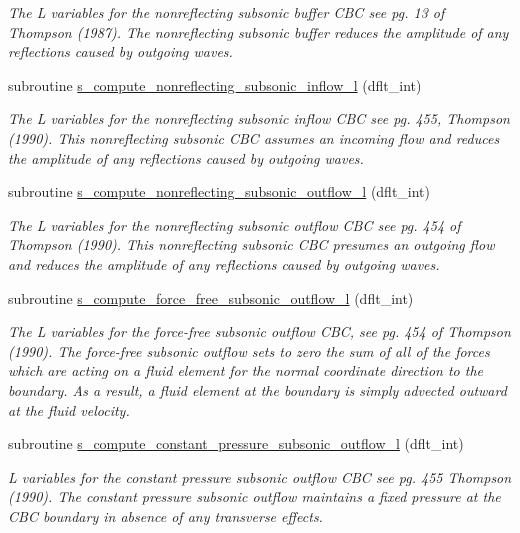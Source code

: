\begin{DoxyCompactItemize}
\begin{DoxyCompactList}\small\item\em The L variables for the nonreflecting subsonic buffer C\+BC see pg. 13 of Thompson (1987). The nonreflecting subsonic buffer reduces the amplitude of any reflections caused by outgoing waves. \end{DoxyCompactList}\item 
subroutine \hyperlink{namespacem__cbc_aaaa6698b1ae1671a9124bb22617b4b8c}{s\+\_\+compute\+\_\+nonreflecting\+\_\+subsonic\+\_\+inflow\+\_\+l} (dflt\+\_\+int)
\begin{DoxyCompactList}\small\item\em The L variables for the nonreflecting subsonic inflow C\+BC see pg. 455, Thompson (1990). This nonreflecting subsonic C\+BC assumes an incoming flow and reduces the amplitude of any reflections caused by outgoing waves. \end{DoxyCompactList}\item 
subroutine \hyperlink{namespacem__cbc_af0664437857269683e572ec7b5e3b4b7}{s\+\_\+compute\+\_\+nonreflecting\+\_\+subsonic\+\_\+outflow\+\_\+l} (dflt\+\_\+int)
\begin{DoxyCompactList}\small\item\em The L variables for the nonreflecting subsonic outflow C\+BC see pg. 454 of Thompson (1990). This nonreflecting subsonic C\+BC presumes an outgoing flow and reduces the amplitude of any reflections caused by outgoing waves. \end{DoxyCompactList}\item 
subroutine \hyperlink{namespacem__cbc_ab95f6f268802b6330f4aef16685ae498}{s\+\_\+compute\+\_\+force\+\_\+free\+\_\+subsonic\+\_\+outflow\+\_\+l} (dflt\+\_\+int)
\begin{DoxyCompactList}\small\item\em The L variables for the force-\/free subsonic outflow C\+BC, see pg. 454 of Thompson (1990). The force-\/free subsonic outflow sets to zero the sum of all of the forces which are acting on a fluid element for the normal coordinate direction to the boundary. As a result, a fluid element at the boundary is simply advected outward at the fluid velocity. \end{DoxyCompactList}\item 
subroutine \hyperlink{namespacem__cbc_abbe02209311e19efb816f7678a8a9584}{s\+\_\+compute\+\_\+constant\+\_\+pressure\+\_\+subsonic\+\_\+outflow\+\_\+l} (dflt\+\_\+int)
\begin{DoxyCompactList}\small\item\em L variables for the constant pressure subsonic outflow C\+BC see pg. 455 Thompson (1990). The constant pressure subsonic outflow maintains a fixed pressure at the C\+BC boundary in absence of any transverse effects. \end{DoxyCompactList}\item 

\end{DoxyCompactItemize}
